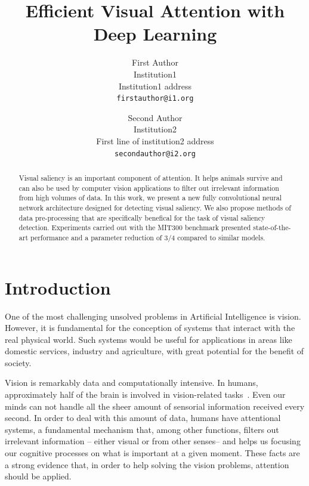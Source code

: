 \documentclass[10pt,twocolumn,letterpaper]{article}
\begin{document}
\title{Efficient Visual Attention with Deep Learning}

\author{First Author\\
Institution1\\
Institution1 address\\
{\tt\small firstauthor@i1.org}
\and
Second Author\\
Institution2\\
First line of institution2 address\\
{\tt\small secondauthor@i2.org}
}

\maketitle

\begin{abstract}
Visual saliency is an important component of attention.
It helps animals survive and can also be used by computer vision applications
to filter out irrelevant information from high volumes of data.
In this work, we present a new fully convolutional neural network
architecture designed for detecting visual saliency.
We also propose methods of data pre-processing that are specifically
benefical for the task of visual saliency detection.
Experiments carried out with the MIT300 benchmark presented state-of-the-art
performance and a parameter reduction of 3/4 compared to similar models.
\end{abstract}

\section{Introduction}
One of the most challenging unsolved problems in Artificial Intelligence
is vision.
However, it is fundamental for the conception of systems that interact
with the real physical world.
Such systems would be useful for applications in areas like
domestic services, industry and agriculture,
with great potential for the benefit of society.

Vision is remarkably data and computationally intensive.
In humans, approximately half of the brain is involved in
vision-related tasks~\cite{fixott_1957}.
Even our minds can not handle all the sheer amount of sensorial information
received every second. In order to deal with this amount of data,
humans have attentional systems, a fundamental mechanism
that, among other functions, filters out irrelevant information
-- either visual or from other senses-- and helps us focusing our cognitive
processes on what is important at a given moment.
These facts are a strong evidence that, in order to help solving the
vision problems, attention should be applied.
\end{document}
